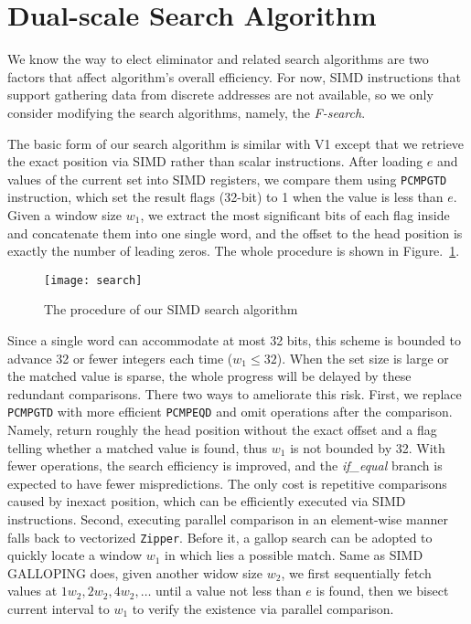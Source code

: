 \section{Dual-scale Search Algorithm}

We know the way to elect eliminator and related search algorithms are two factors that affect algorithm's overall efficiency.
For now, SIMD instructions that support gathering data from discrete addresses are not available, so we only consider modifying the search algorithms, namely, the \textit{F-search}.

The basic form of our search algorithm is similar with V1 except that we retrieve the exact position via SIMD rather than scalar instructions.
After loading $ e $ and values of the current set into SIMD registers, we compare them using \texttt{PCMPGTD} instruction, which set the result flags (32-bit) to 1 when the value is less than $ e $.
Given a window size $ w_1 $, we extract the most significant bits of each flag inside and concatenate them into one single word, and the offset to the head position is exactly the number of leading zeros.
The whole procedure is shown in Figure.~\ref{fig: search}.
\begin{figure}
	\centering
	\texttt{[image: search]}
	\caption{The procedure of our SIMD search algorithm}
	\label{fig: search}
\end{figure}

Since a single word can accommodate at most 32 bits, this scheme is bounded to advance 32 or fewer integers each time ($ w_1 \leq 32 $).
When the set size is large or the matched value is sparse, the whole progress will be delayed by these redundant comparisons.
There two ways to ameliorate this risk.
First, we replace \texttt{PCMPGTD} with more efficient \texttt{PCMPEQD} and omit operations after the comparison.
Namely, return roughly the head position without the exact offset and a flag telling whether a matched value is found, thus $ w_1 $ is not bounded by 32.
With fewer operations, the search efficiency is improved, and the \textit{if\_equal} branch is expected to have fewer mispredictions.
The only cost is repetitive comparisons caused by inexact position, which can be efficiently executed via SIMD instructions.
Second, executing parallel comparison in an element-wise manner falls back to vectorized \texttt{Zipper}.
Before it, a gallop search can be adopted to quickly locate a window $ w_1 $ in which lies a possible match.
Same as SIMD GALLOPING does, given another widow size $ w_2 $, we first sequentially fetch values at $ 1w_2,2w_2,4w_2,\dots $ until a value not less than $ e $ is found, then we bisect current interval to $ w_1 $ to verify the existence via parallel comparison.

